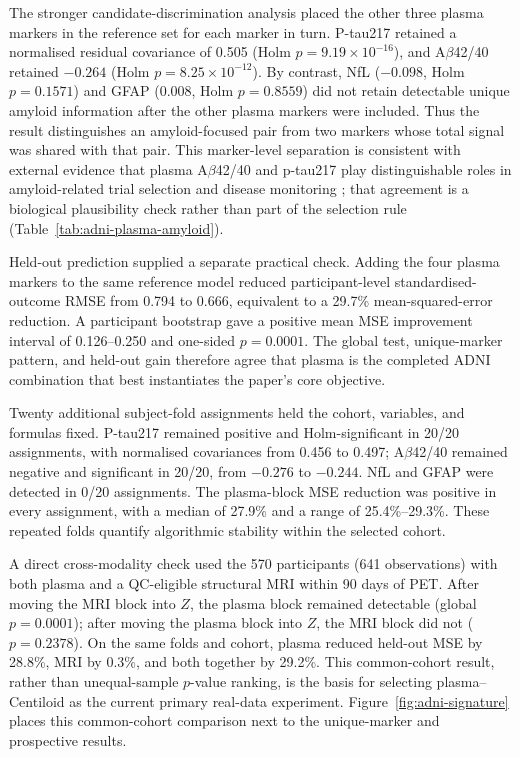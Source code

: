 \documentclass[11pt]{article}
\theoremstyle{definition}
\begin{document}
The stronger candidate-discrimination analysis placed the other three plasma markers in the
reference set for each marker in turn. P-tau217 retained a normalised residual covariance of
0.505 (Holm $p=9.19\times10^{-16}$), and A$\beta$42/40 retained $-0.264$
(Holm $p=8.25\times10^{-12}$). By contrast, NfL ($-0.098$, Holm $p=0.1571$) and GFAP
(0.008, Holm $p=0.8559$) did not retain detectable unique amyloid information after the other
plasma markers were included. Thus the result distinguishes an amyloid-focused pair from two
markers whose total signal was shared with that pair. This marker-level separation is
consistent with external evidence
that plasma A$\beta$42/40 and p-tau217 play distinguishable roles in amyloid-related trial
selection and disease monitoring \cite{ashton2022}; that agreement is a biological
plausibility check rather than part of the selection rule (Table~\ref{tab:adni-plasma-amyloid}).

Held-out prediction supplied a separate practical check. Adding the four plasma markers to the
same reference model reduced participant-level standardised-outcome RMSE from 0.794 to 0.666,
equivalent to a 29.7\% mean-squared-error reduction. A participant bootstrap gave a positive
mean MSE improvement interval of 0.126--0.250 and one-sided $p=0.0001$. The global test,
unique-marker pattern, and held-out gain therefore agree that plasma is the completed ADNI
combination that best instantiates the paper's core objective.

Twenty additional subject-fold assignments held the cohort, variables, and formulas fixed.
P-tau217 remained positive and Holm-significant in 20/20 assignments, with normalised
covariances from 0.456 to 0.497; A$\beta$42/40 remained negative and significant in 20/20,
from $-0.276$ to $-0.244$. NfL and GFAP were detected in 0/20 assignments. The plasma-block
MSE reduction was positive in every assignment, with a median of 27.9\% and a range of
25.4\%--29.3\%. These repeated folds quantify algorithmic stability within the selected cohort.

A direct cross-modality check used the 570 participants (641 observations) with both plasma
and a QC-eligible structural MRI within 90 days of PET. After moving the MRI block into $Z$,
the plasma block remained detectable (global $p=0.0001$); after moving the plasma block into
$Z$, the MRI block did not ($p=0.2378$). On the same folds and cohort, plasma reduced held-out
MSE by 28.8\%, MRI by 0.3\%, and both together by 29.2\%. This common-cohort result, rather
than unequal-sample $p$-value ranking, is the basis for selecting plasma--Centiloid as the
current primary real-data experiment.
Figure~\ref{fig:adni-signature} places this common-cohort comparison next to the unique-marker
and prospective results.
\end{document}
